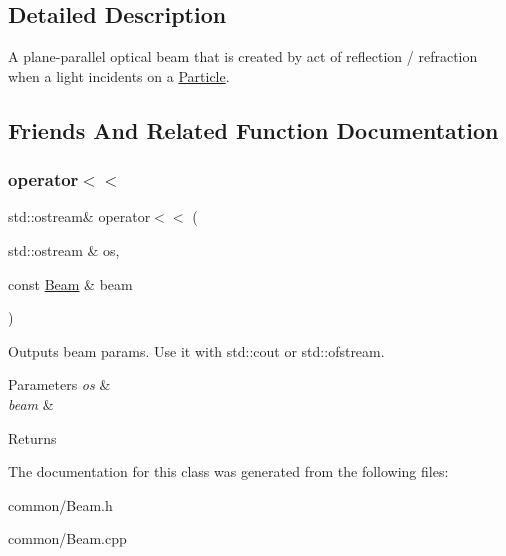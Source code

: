 \subsection{Detailed Description}
A plane-\/parallel optical beam that is created by act of reflection / refraction when a light incidents on a \mbox{\hyperlink{class_particle}{Particle}}. 

\subsection{Friends And Related Function Documentation}
\mbox{\label{class_beam_a9329c5f95148c6d5fc95d72ab66d8265}} 
\subsubsection{\texorpdfstring{operator$<$$<$}{operator<<}}
{\footnotesize\ttfamily std\+::ostream\& operator$<$$<$ (\begin{DoxyParamCaption}\item[{std\+::ostream \&}]{os,  }\item[{const \mbox{\hyperlink{class_beam}{Beam}} \&}]{beam }\end{DoxyParamCaption})\hspace{0.3cm}{\ttfamily [friend]}}



Outputs beam params. Use it with std\+::cout or std\+::ofstream. 


\begin{DoxyParams}{Parameters}
{\em os} & \\
\hline
{\em beam} & \\
\hline
\end{DoxyParams}
\begin{DoxyReturn}{Returns}

\end{DoxyReturn}


The documentation for this class was generated from the following files\+:\begin{DoxyCompactItemize}
\item 
common/Beam.\+h\item 
common/Beam.\+cpp\end{DoxyCompactItemize}
